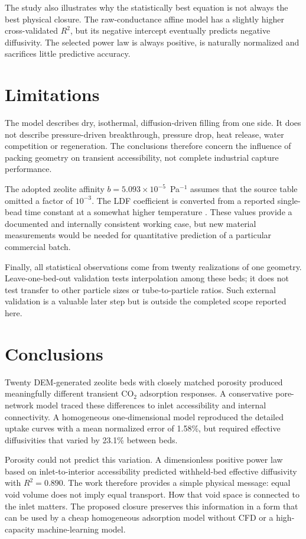 \documentclass[11pt,a4paper]{article}
\begin{document}
The study also illustrates why the statistically best equation is not always
the best physical closure. The raw-conductance affine model has a slightly
higher cross-validated $R^2$, but its negative intercept eventually predicts
negative diffusivity. The selected power law is always positive, is naturally
normalized and sacrifices little predictive accuracy.

\section{Limitations}\label{sec:limitations}

The model describes dry, isothermal, diffusion-driven filling from one side.
It does not describe pressure-driven breakthrough, pressure drop, heat release,
water competition or regeneration. The conclusions therefore concern the
influence of packing geometry on transient accessibility, not complete
industrial capture performance.

The adopted zeolite affinity $b=5.093\times10^{-5}$~Pa$^{-1}$ assumes that the
source table omitted a factor of $10^{-3}$. The LDF coefficient is converted
from a reported single-bead time constant at a somewhat higher temperature
\cite{Hu2014}. These values provide a documented and internally consistent
working case, but new material measurements would be needed for quantitative
prediction of a particular commercial batch.

Finally, all statistical observations come from twenty realizations of one
geometry. Leave-one-bed-out validation tests interpolation among these beds;
it does not test transfer to other particle sizes or tube-to-particle ratios.
Such external validation is a valuable later step but is outside the completed
scope reported here.

\section{Conclusions}

Twenty DEM-generated zeolite beds with closely matched porosity produced
meaningfully different transient CO$_2$ adsorption responses. A conservative
pore-network model traced these differences to inlet accessibility and internal
connectivity. A homogeneous one-dimensional model reproduced the detailed
uptake curves with a mean normalized error of 1.58\%, but required effective
diffusivities that varied by 23.1\% between beds.

Porosity could not predict this variation. A dimensionless positive power law
based on inlet-to-interior accessibility predicted withheld-bed effective
diffusivity with $R^2=0.890$. The work therefore provides a simple physical
message: equal void volume does not imply equal transport. How that void space
is connected to the inlet matters. The proposed closure preserves this
information in a form that can be used by a cheap homogeneous adsorption model
without CFD or a high-capacity machine-learning model.
\end{document}
